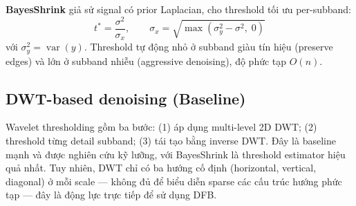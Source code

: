 \textbf{BayesShrink} \cite{chang2000} giả sử signal có prior Laplacian, cho threshold tối ưu per-subband:
\begin{equation}
    t^* = \frac{\sigma^2}{\sigma_x}, \qquad \sigma_x = \sqrt{\max(\sigma_y^2 - \sigma^2,\;0)}
    \label{eq:bayesshrink}
\end{equation}
với $\sigma_y^2 = \operatorname{var}(y)$. Threshold tự động nhỏ ở subband giàu tín hiệu (preserve edges) và lớn ở subband nhiễu (aggressive denoising), độ phức tạp $O(n)$.

\subsection{DWT-based denoising (Baseline)}

Wavelet thresholding gồm ba bước: (1) áp dụng multi-level 2D DWT; (2) threshold từng detail subband; (3) tái tạo bằng inverse DWT. Đây là baseline mạnh và được nghiên cứu kỹ lưỡng, với BayesShrink là threshold estimator hiệu quả nhất. Tuy nhiên, DWT chỉ có ba hướng cố định (horizontal, vertical, diagonal) ở mỗi scale --- không đủ để biểu diễn sparse các cấu trúc hướng phức tạp --- đây là động lực trực tiếp để sử dụng DFB.
